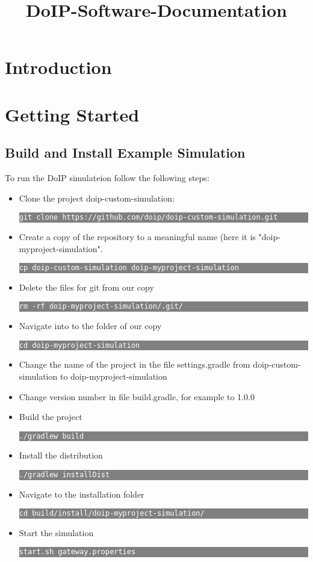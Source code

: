 \documentclass[a4paper]{article}
\title{DoIP-Software-Documentation}
\newcommand{\terminal}[1]{

\colorbox{gray}{\parbox{\textwidth}{\texttt{\textcolor{white}{\footnotesize{#1}}}}}


}
\begin{document}
\maketitle

\tableofcontents

\section{Introduction}

\section{Getting Started}

	\subsection{Build and Install Example Simulation}
		To run the DoIP simulateion follow the following steps:

		\begin{itemize}
			\item Clone the project doip-custom-simulation:

			\terminal{git clone https://github.com/doip/doip-custom-simulation.git}
			
			\item Create a copy of the repository to a meaningful name (here
				it is "doip-myproject-simulation".

			\terminal{cp doip-custom-simulation doip-myproject-simulation}

			\item Delete the files for git from our copy

			\terminal{rm -rf doip-myproject-simulation/.git/}

			\item Navigate into to the folder of our copy

			\terminal{cd doip-myproject-simulation}

			\item Change the name of the project in the file settings.gradle from
			doip-custom-simulation to doip-myproject-simulation

			\item Change version number in file build.gradle, for example to 1.0.0

			\item Build the project

			\terminal{./gradlew build}

			\item Install the distribution

			\terminal{./gradlew installDist}

			\item Navigate to the installation folder

			\terminal{cd build/install/doip-myproject-simulation/}

			\item Start the simulation

			\terminal{start.sh gateway.properties}

		\end{itemize}
\end{document}
